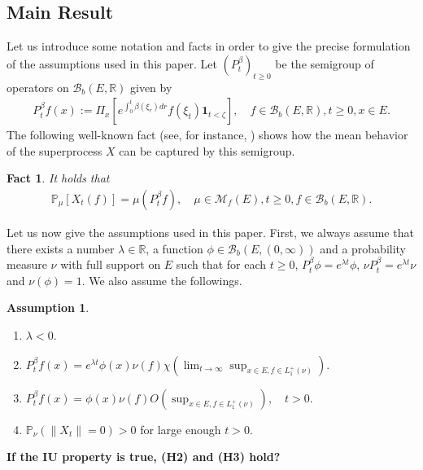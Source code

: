 \documentclass[12pt,a4paper]{amsart}
\numberwithin{equation}{section}
\theoremstyle{plain}
\newtheorem{fact}[thm]{Fact}
\theoremstyle{definition}
\newtheorem*{asp*}{Assumption}
\theoremstyle{remark}
\begin{document}
\subsection{Main Result}
Let us introduce some notation and facts in order to give the precise formulation of the assumptions used in this paper.
Let $(P_t^\beta)_{t\geq 0}$ be the semigroup of operators on $\mathcal B_b(E,\mathbb R)$ given by
\begin{align}
P_t^\beta f(x)
:= \Pi_x[e^{\int_0^t \beta(\xi_r)dr }f(\xi_t) \mathbf 1_{t < \zeta}],
\quad f\in \mathcal B_b(E,\mathbb R), t\geq 0, x\in E.
\end{align}
The following well-known fact (see, for instance, \cite[Proposition 2.27]{Li2011MeasureValued}) shows how the mean behavior of the superprocess $X$ can be captured by this semigroup.
\begin{fact} \label{Fact:M!}
It holds that
\begin{align}
\mathbb P_\mu[X_t(f)]
= \mu (P_t^\beta f),
\quad \mu \in \mathcal M_f(E), t\geq 0, f \in \mathcal B_b(E,\mathbb R).
\end{align}
\end{fact}
\par
Let us now give the assumptions used in this paper.
First, we always assume that there exists a number $\lambda \in \mathbb R$, a function $\phi \in \mathcal B_b(E,(0,\infty))$ and a probability measure $\nu$ with full support on $E$ such that for each $t\geq 0$, $P_t^\beta \phi = e^{\lambda t}\phi$, $\nu P_t^\beta = e^{\lambda t} \nu$ and $\nu(\phi) = 1$.
We also assume the followings.
\begin{asp*}
\begin{enumerate}[label =(H\arabic*)]
\item \label{Assumption:H1!}
$\lambda < 0$.
\item \label{Assumption:H2!}
$
P_t^\beta f(x)
= e^{\lambda t} \phi(x) \nu(f) \chi( \lim_{t\to \infty} \sup_{x\in E, f\in L_1^+(\nu)}).
$
\item \label{Assumption:H3!}
$
P_t^\beta f(x)
= \phi(x) \nu(f) O(\sup_{x\in E, f \in L_1^+(\nu)}),
\quad t>0.
$
\item \label{Assumption:H4!}
$\mathbb P_\nu(\|X_t\| = 0)>0$ for large enough $t>0$.
\end{enumerate}
\end{asp*}
{\bf If the IU property is true, (H2) and (H3) hold?}
\end{document}
